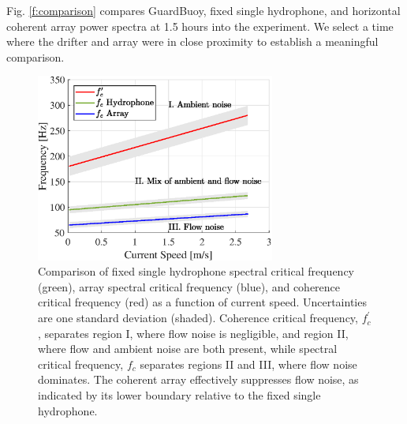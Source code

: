 \documentclass[12pt,journal,onecolumn]{IEEEtran}
\begin{document}
Fig. \ref{f:comparison} compares GuardBuoy, fixed single hydrophone, and horizontal coherent array power spectra at 1.5 hours into the experiment. We select a time where the drifter and array were in close proximity to establish a meaningful comparison.
\begin{figure}[!t]
	\begin{center}
		\includegraphics[width=0.7\textwidth]{figure7.eps} %
	\end{center}
	\caption[Comparison of spectral sloping and spatial coherence thresholding]{
	\label{f:array_perform}
	Comparison of fixed single hydrophone spectral critical frequency (green), array spectral critical frequency (blue), and coherence critical frequency (red) as a function of current speed. Uncertainties are one standard deviation (shaded). Coherence critical frequency, $f^\prime_c$, separates region I, where flow noise is negligible, and region II, where flow and ambient noise are both present, while spectral critical frequency, $f_c$  separates regions II and III, where flow noise dominates. The coherent array effectively suppresses flow noise, as indicated by its lower boundary relative to the fixed single hydrophone. }
\end{figure}
\end{document}
